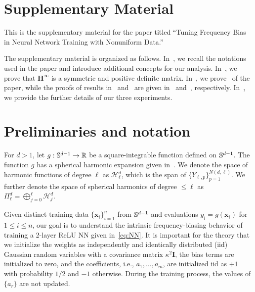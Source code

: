 % 


\newpage 
\setcounter{page}{0}
\setcounter{page}{1}
\appendix

\section*{Supplementary Material}
This is the  supplementary material for the paper titled ``Tuning Frequency Bias in Neural Network Training with Nonuniform Data.'' 

The supplementary material is organized as follows. In~, we recall the notations used in the paper and introduce additional concepts for our analysis. In~, we prove that $\mathbf{H}^\infty$ is a symmetric and positive definite matrix. In~, we prove~ of the paper, while the proofs of results in~ and~ are given in~ and~, respectively. In~, we provide the further details of our three experiments. 

\section{Preliminaries and notation}\label{sec:prelim_supp}
For $d>1$, let $g: {\mathbb{S}}^{d-1} \rightarrow \mathbb{R}$ be a square-integrable function defined on ${\mathbb{S}}^{d-1}$. The function $g$ has a spherical harmonic expansion given in~. We denote the space of harmonic functions of degree $\ell$ as  $\mathcal{H}^d_\ell$, which is the span of $\{Y_{\ell,p}\}_{p=1}^{N(d,\ell)}$. We further denote the space of spherical harmonics of degree $\leq \ell$ as $\Pi_\ell^d = \bigoplus_{j=0}^\ell \mathcal{H}_j^d$.

Given distinct training data $\{\mathbf{x}_i\}_{i=1}^n$ from ${\mathbb{S}}^{d-1}$ and evaluations $y_i = g(\mathbf{x}_i)$ for $1\leq i\leq n$, our goal is to understand the intrinsic frequency-biasing behavior of training a 2-layer ReLU NN given in~\cref{eq:NN}. It is important for the theory that we initialize the weights as independently and identically distributed (iid) Gaussian random variables with a covariance matrix $\kappa^2\mathbf{I}$, the bias terms are initialized to zero, and the coefficients, i.e., $a_1,\ldots,a_m$, are initialized iid as $+1$ with probability $1/2$ and $-1$ otherwise. During the training process, the values of $\{a_r\}$ are not updated. 

